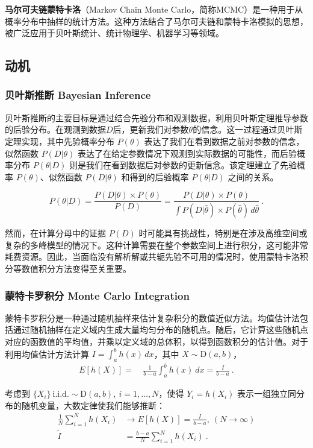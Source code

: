 
\textbf{马尔可夫链蒙特卡洛}（Markov Chain Monte Carlo，简称MCMC）是一种用于从概率分布中抽样的统计方法。这种方法结合了马尔可夫链和蒙特卡洛模拟的思想，被广泛应用于贝叶斯统计、统计物理学、机器学习等领域。

\subsection{动机}
\subsubsection{贝叶斯推断 Bayesian Inference}

贝叶斯推断的主要目标是通过结合先验分布和观测数据，利用贝叶斯定理推导参数的后验分布。在观测到数据\(D\)后，更新我们对参数\(\theta\)的信念。这一过程通过贝叶斯定理实现，其中先验概率分布 \(P(\theta)\) 表达了我们在看到数据之前对参数的信念，似然函数 \(P(D|\theta)\) 表达了在给定参数情况下观测到实际数据的可能性，而后验概率分布 \(P(\theta|D)\) 则是我们在看到数据后对参数的更新信念。该定理建立了先验概率 \(P(\theta)\)、似然函数 \(P(D|\theta)\) 和得到的后验概率 \(P(\theta|D)\) 之间的关系。

\begin{equation}
P(\theta|D) = \frac{P(D|\theta) \times P(\theta)}{P(D)} = \frac{P(D|\theta) \times P(\theta)}{\int P(D|\hat{\theta}) \times P(\hat{\theta}) \, d\hat{\theta}}~.
\end{equation}

然而，在计算分母中的证据 \(P(D)\) 时可能具有挑战性，特别是在涉及高维空间或复杂的多峰模型的情况下。这种计算需要在整个参数空间上进行积分，这可能非常耗费资源。因此，当面临没有解析解或共轭先验不可用的情况时，使用蒙特卡洛积分等数值积分方法变得至关重要。

\subsubsection{蒙特卡罗积分 Monte Carlo Integration}

蒙特卡罗积分是一种通过随机抽样来估计复杂积分的数值近似方法。均值估计法包括通过随机抽样在定义域内生成大量均匀分布的随机点。随后，它计算这些随机点对应的函数值的平均值，并乘以定义域的总体积，以得到函数积分的估计值。对于利用均值估计方法计算 \(I = \int_a^b h(x) \,dx\)，其中 \(X \sim \text{D}(a,b)\)，
\begin{align} 
E [h(X)] =& \  \frac{1}{b-a} \int_a^b h(x) \ dx = \frac{I}{b-a}~.
\end{align}

考虑到 \(\{ X_i\} \ \text{i.i.d.}  \sim \text{D}(a,b), \ i=1,\ldots,N \)，使得 \(Y_i = h(X_i)\) 表示一组独立同分布的随机变量，大数定律使我们能够推断：
\begin{align} 
\frac{1}{N} \sum_{i=1}^N h(X_i) & \to E [h(X)] = \frac{I}{b-a}, \ (N \to \infty)\\
\tilde I &= \frac{b-a}{N} \sum_{i=1}^N h(X_i)~.
\end{align}